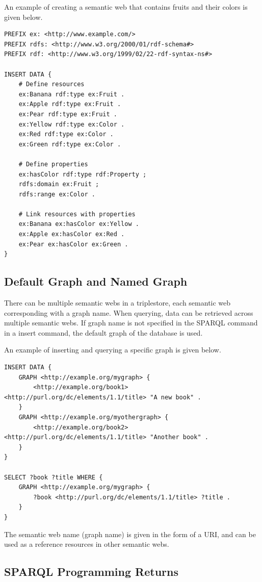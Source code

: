 An example of creating a semantic web that contains fruits and their colors is given below.
\begin{lstlisting}
PREFIX ex: <http://www.example.com/>
PREFIX rdfs: <http://www.w3.org/2000/01/rdf-schema#>
PREFIX rdf: <http://www.w3.org/1999/02/22-rdf-syntax-ns#>

INSERT DATA {
	# Define resources
	ex:Banana rdf:type ex:Fruit .
	ex:Apple rdf:type ex:Fruit .
	ex:Pear rdf:type ex:Fruit .
	ex:Yellow rdf:type ex:Color .
	ex:Red rdf:type ex:Color .
	ex:Green rdf:type ex:Color .
	
	# Define properties
	ex:hasColor rdf:type rdf:Property ;
	rdfs:domain ex:Fruit ;
	rdfs:range ex:Color .
	
	# Link resources with properties
	ex:Banana ex:hasColor ex:Yellow .
	ex:Apple ex:hasColor ex:Red .
	ex:Pear ex:hasColor ex:Green .
}
\end{lstlisting}

\subsection{Default Graph and Named Graph}

There can be multiple semantic webs in a triplestore, each semantic web corresponding with a graph name. When querying, data can be retrieved across multiple semantic webs. If graph name is not specified in the SPARQL command in a insert command, the default graph of the database is used.

An example of inserting and querying a specific graph is given below.
\begin{lstlisting}
INSERT DATA {
	GRAPH <http://example.org/mygraph> {
		<http://example.org/book1> <http://purl.org/dc/elements/1.1/title> "A new book" .
	}
	GRAPH <http://example.org/myothergraph> {
		<http://example.org/book2> <http://purl.org/dc/elements/1.1/title> "Another book" .
	}
}

SELECT ?book ?title WHERE {
	GRAPH <http://example.org/mygraph> {
		?book <http://purl.org/dc/elements/1.1/title> ?title .
	}
}
\end{lstlisting}
The semantic web name (graph name) is given in the form of a URI, and can be used as a reference resources in other semantic webs.

\subsection{SPARQL Programming Returns}

